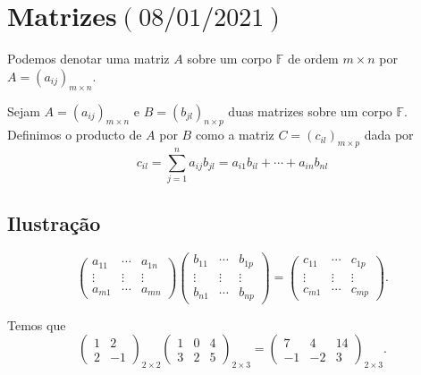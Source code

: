 \chapter{Matrizes\quad$\left(08/01/2021\right)$}

Podemos denotar uma matriz $A$ sobre um corpo $\mathbb{F}$ de ordem
$m\times n$ por $A={\left(a_{ij}\right)}_{m\times n}$.

Sejam $A={\left(a_{ij}\right)}_{m\times n}$ e
$B={\left(b_{jl}\right)}_{n\times p}$ duas matrizes sobre um corpo
$\mathbb{F}$.
Definimos o producto de $A$ por $B$ como a matriz
$C={\left(c_{il}\right)}_{m\times p}$ dada por
\[
  c_{il}=
  \sum_{j=1}^{n}
  a_{i j}b_{jl}=
  a_{i1}b_{il}+\cdots+a_{in}b_{nl}
\]

\section*{Ilustração}

\[
  \begin{pmatrix}
    a_{11} & \cdots & a_{1n} \\
    \vdots & \vdots & \vdots \\
    a_{m1} & \cdots & a_{mn}
  \end{pmatrix}
  \begin{pmatrix}
    b_{11} & \cdots & b_{1p} \\
    \vdots & \vdots & \vdots \\
    b_{n1} & \cdots & b_{np}
  \end{pmatrix}=
  \begin{pmatrix}
    c_{11} & \cdots & c_{1p} \\
    \vdots & \vdots & \vdots \\
    c_{m1} & \cdots & c_{mp}
  \end{pmatrix}.
\]

\begin{example}
  Temos que
  \[
    {\begin{pmatrix}
          1 & 2  \\
          2 & -1
        \end{pmatrix}}_{2\times2}
      {\begin{pmatrix}
          1 & 0 & 4 \\
          3 & 2 & 5
        \end{pmatrix}}_{2\times3}=
    {\begin{pmatrix}
      7  & 4  & 14 \\
      -1 & -2 & 3
    \end{pmatrix}}_{2\times3}.
  \]
\end{example}

